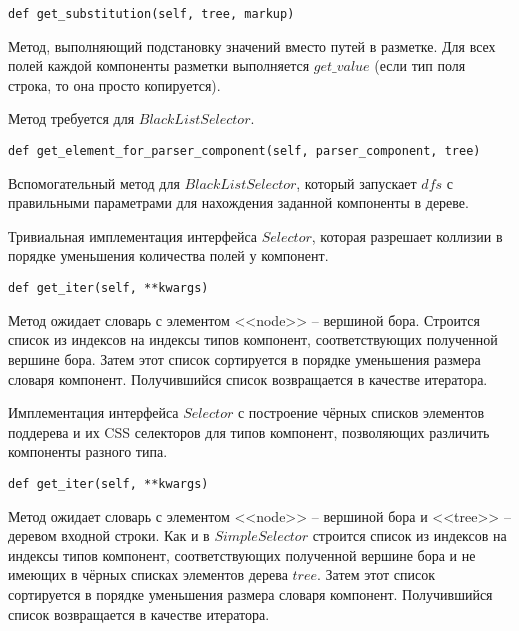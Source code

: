\begin{lstlisting}
def get_substitution(self, tree, markup)
\end{lstlisting}
Метод, выполняющий подстановку значений вместо путей в разметке. Для всех полей каждой компоненты разметки выполняется $get\_value$ (если тип поля строка, то она просто копируется).

Метод требуется для $BlackListSelector$.
\\

\begin{lstlisting}
def get_element_for_parser_component(self, parser_component, tree)
\end{lstlisting}
Вспомогательный метод для $BlackListSelector$, который запускает $dfs$ с правильными параметрами для нахождения заданной компоненты в дереве.
\\


Тривиальная имплементация интерфейса $Selector$, которая разрешает коллизии в порядке уменьшения количества полей у компонент.
\\

\begin{lstlisting}
def get_iter(self, **kwargs)
\end{lstlisting}
Метод ожидает словарь с элементом <<node>> -- вершиной бора. Строится список из индексов на индексы типов компонент, соответствующих полученной вершине бора. Затем этот список сортируется в порядке уменьшения размера словаря компонент. Получившийся список возвращается в качестве итератора.
\\


Имплементация интерфейса $Selector$ с построение чёрных списков элементов поддерева и их CSS селекторов для типов компонент, позволяющих различить компоненты разного типа.
\\

\begin{lstlisting}
def get_iter(self, **kwargs)
\end{lstlisting}
Метод ожидает словарь с элементом <<node>> -- вершиной бора и <<tree>> -- деревом входной строки. Как и в $SimpleSelector$ строится список из индексов на индексы типов компонент, соответствующих полученной вершине бора и не имеющих в чёрных списках элементов дерева $tree$. Затем этот список сортируется в порядке уменьшения размера словаря компонент. Получившийся список возвращается в качестве итератора.
\\

